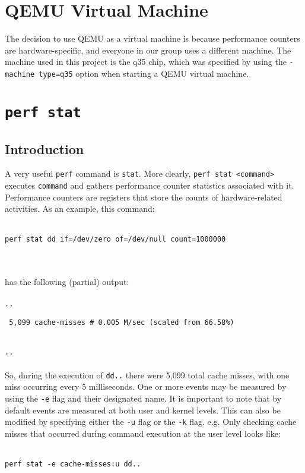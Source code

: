 \documentclass{article}
\begin{document}
\section{QEMU Virtual Machine}
The decision to use QEMU as a virtual machine is because performance counters are hardware-specific, and everyone in our group uses a different machine. The machine used in this project is the q35 chip, which was specified by using the \texttt{-machine type=q35} option when starting a QEMU virtual machine. %
\pagebreak
\section{\texttt{perf stat}}
\subsection{Introduction}
A very useful \verb|perf| command is \verb|stat|. More clearly, \texttt{perf stat <command>} executes \texttt{command} and gathers performance counter statistics associated with it. Performance counters are registers that store the counts of hardware-related activities. As an example, this command:
\\\\
\centerline{\texttt{perf stat dd if=/dev/zero of=/dev/null count=1000000}}
\\\\
has the following (partial) output:
\\\\
\texttt{..}\\
\centerline{\texttt{ 5,099 cache-misses \hspace{5mm} \# \hspace{5mm} 0.005 M/sec (scaled from 66.58\%)}}\\
\texttt{..}
\\\\
So, during the execution of \verb|dd..| there were 5,099 total cache misses, with one miss occurring every 5 milliseconds.
One or more events may be measured by using the \texttt{-e} flag and their designated name. It is important to note that by default events are measured at both user and kernel levels. This can also be modified by specifying either the \texttt{-u} flag or the \texttt{-k} flag. e.g. Only checking cache misses that occurred during command execution at the user level looks like:
\\\\
\centerline{\texttt{perf stat -e cache-misses:u dd..}}
\\\\
\end{document}
